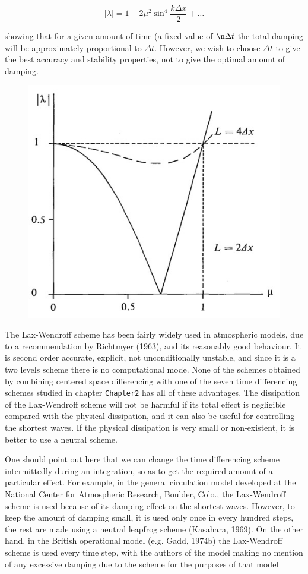 \[|\lambda| = 1 - 2\mu^{2}\sin^{4}\frac{k\Delta x}{2} + \ldots\]

showing that for a given amount of time (a fixed value of
\(\n \Delta t\) the total damping will be approximately
proportional to \(\Delta t\). However, we wish to choose \(\Delta t\)
to give the best accuracy and stability properties, not to give the
optimal amount of damping.

\begin{figure}
 \centering
 \includegraphics[keepaspectratio]{figs/NM/pic12.jpg}
 \caption{} \label{fig:}
\end{figure}

The Lax-Wendroff scheme has been fairly widely used in atmospheric
models, due to a recommendation by Richtmyer (1963), and its reasonably
good behaviour. It is second order accurate, explicit, not
unconditionally unstable, and since it is a two levels scheme there is
no computational mode. None of the schemes obtained by combining
centered space differencing with one of the seven time differencing
schemes studied in chapter \texttt{Chapter2} has all of these
advantages. The dissipation of the Lax-Wendroff scheme will not be
harmful if its total effect is negligible compared with the physical
dissipation, and it can also be useful for controlling the shortest
waves. If the physical dissipation is very small or non-existent, it is
better to use a neutral scheme.

One should point out here that we can change the time differencing
scheme intermittedly during an integration, so as to get the required
amount of a particular effect. For example, in the general circulation
model developed at the National Center for Atmospheric Research,
Boulder, Colo., the Lax-Wendroff scheme is used because of its damping
effect on the shortest waves. However, to keep the amount of damping
small, it is used only once in every hundred steps, the rest are made
using a neutral leapfrog scheme (Kasahara, 1969). On the other hand, in
the British operational model (e.g. Gadd, 1974b) the Lax-Wendroff scheme
is used every time step, with the authors of the model making no mention
of any excessive damping due to the scheme for the purposes of that
model

